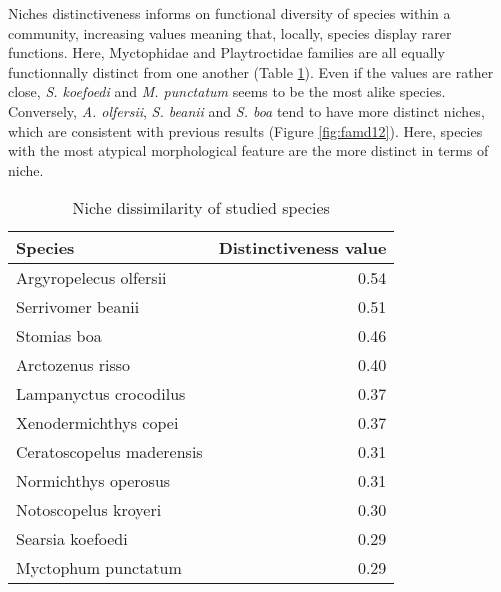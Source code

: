 Niches distinctiveness informs on functional diversity of species within a community, increasing values meaning that, locally, species display rarer functions. Here, Myctophidae and Playtroctidae families are all equally functionnally distinct from one another (Table \ref{table:nich_diss}). Even if the values are rather close, \textit{S. koefoedi} and \textit{M. punctatum} seems to be the most alike species. Conversely, \textit{A. olfersii}, \textit{S. beanii} and \textit{S. boa} tend to have more distinct niches, which are consistent with previous results (Figure \ref{fig:famd12}). Here, species with the most atypical morphological feature are the more distinct in terms of niche. 

\begin{table}[!htbp]
\centering
\caption[Dissimilarities values of species' niches]{Niche dissimilarity of studied species}
\label{table:nich_diss}
\begin{adjustbox}{max width=1.1\textwidth,center}
\begin{tabular}{lr}
  \hline
Species & Distinctiveness value \\ 
  \hline
Argyropelecus olfersii & 0.54 \\ 
  Serrivomer beanii & 0.51 \\ 
  Stomias boa & 0.46 \\ 
  Arctozenus risso & 0.40 \\ 
  Lampanyctus crocodilus & 0.37 \\ 
  Xenodermichthys copei & 0.37 \\ 
  Ceratoscopelus maderensis & 0.31 \\ 
  Normichthys operosus & 0.31 \\ 
  Notoscopelus kroyeri & 0.30 \\ 
  Searsia koefoedi & 0.29 \\ 
  Myctophum punctatum & 0.29 \\  
   \hline
\end{tabular}
\end{adjustbox}
\end{table}


